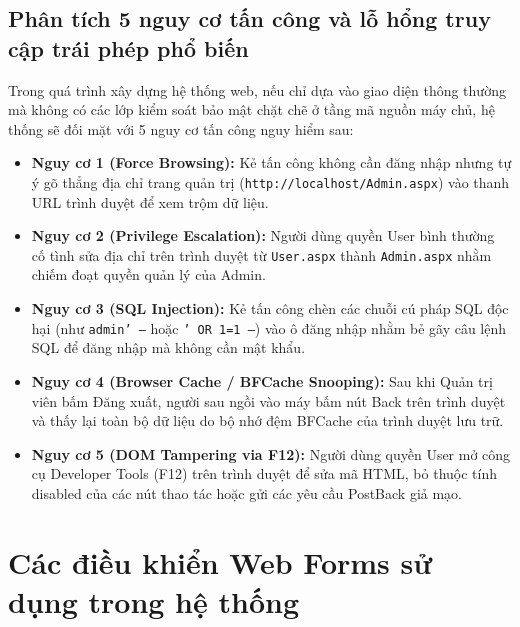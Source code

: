 \documentclass[12pt,a4paper]{report}
\begin{document}
\subsection{Phân tích 5 nguy cơ tấn công và lỗ hổng truy cập trái phép phổ biến}
Trong quá trình xây dựng hệ thống web, nếu chỉ dựa vào giao diện thông thường mà không có các lớp kiểm soát bảo mật chặt chẽ ở tầng mã nguồn máy chủ, hệ thống sẽ đối mặt với 5 nguy cơ tấn công nguy hiểm sau:
\begin{itemize}
    \item \textbf{Nguy cơ 1 (Force Browsing):} Kẻ tấn công không cần đăng nhập nhưng tự ý gõ thẳng địa chỉ trang quản trị (\texttt{http://localhost/Admin.aspx}) vào thanh URL trình duyệt để xem trộm dữ liệu.
    \item \textbf{Nguy cơ 2 (Privilege Escalation):} Người dùng quyền User bình thường cố tình sửa địa chỉ trên trình duyệt từ \texttt{User.aspx} thành \texttt{Admin.aspx} nhằm chiếm đoạt quyền quản lý của Admin.
    \item \textbf{Nguy cơ 3 (SQL Injection):} Kẻ tấn công chèn các chuỗi cú pháp SQL độc hại (như \texttt{admin' --} hoặc \texttt{' OR 1=1 --}) vào ô đăng nhập nhằm bẻ gãy câu lệnh SQL để đăng nhập mà không cần mật khẩu.
    \item \textbf{Nguy cơ 4 (Browser Cache / BFCache Snooping):} Sau khi Quản trị viên bấm Đăng xuất, người sau ngồi vào máy bấm nút Back trên trình duyệt và thấy lại toàn bộ dữ liệu do bộ nhớ đệm BFCache của trình duyệt lưu trữ.
    \item \textbf{Nguy cơ 5 (DOM Tampering via F12):} Người dùng quyền User mở công cụ Developer Tools (F12) trên trình duyệt để sửa mã HTML, bỏ thuộc tính disabled của các nút thao tác hoặc gửi các yêu cầu PostBack giả mạo.
\end{itemize}

\section{Các điều khiển Web Forms sử dụng trong hệ thống}
\end{document}

